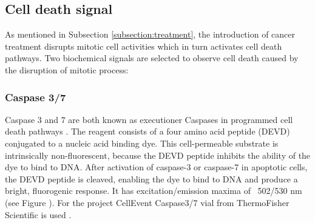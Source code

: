 \documentclass[pdftex,12pt,a4paper]{report}
\begin{document}
\subsection{Cell death signal}
\label{subsection:cell_death_signal}

As mentioned in Subsection \ref{subsection:treatment}, the introduction of cancer treatment disrupts mitotic cell activities which in turn activates cell death pathways. Two biochemical signals are selected to observe cell death caused by the disruption of mitotic process: %

\subsubsection*{Caspase 3/7}

Caspase 3 and 7 are both known as executioner Caspases in programmed cell death pathways \cite{alberts2017molecular}.  The reagent consists of a four amino acid peptide (DEVD) conjugated to a nucleic acid binding dye. This cell-permeable substrate is intrinsically non-fluorescent, because the DEVD peptide inhibits the ability of the dye to bind to DNA. After activation of caspase-3 or caspase-7 in apoptotic cells, the DEVD peptide is cleaved, enabling the dye to bind to DNA and produce a bright, fluorogenic response.  It has excitation/emission maxima of ~502/530 nm (see Figure \cite{fig:caspase_spectra}). For the project CellEvent Caspase3/7 vial from ThermoFisher Scientific is used  \cite{thermofisher2018casp}.
\end{document}
